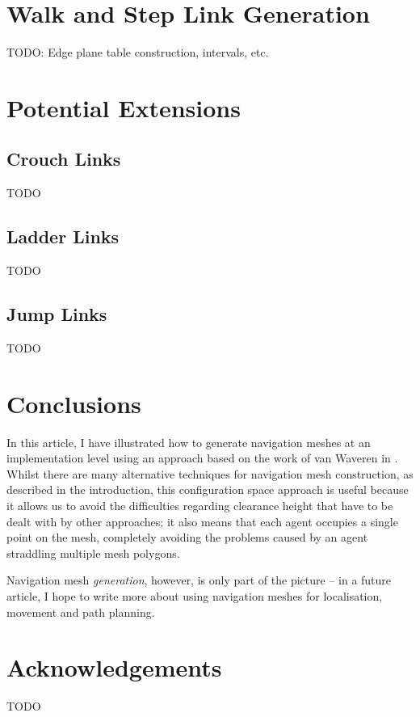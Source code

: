 \documentclass[10pt,twocolumn]{article}
\begin{document}
\section{Walk and Step Link Generation}
\label{sec:walkstep}

TODO: Edge plane table construction, intervals, etc.

\section{Potential Extensions}

\subsection{Crouch Links}

TODO

\subsection{Ladder Links}

TODO

\subsection{Jump Links}

TODO

\section{Conclusions}

In this article, I have illustrated how to generate navigation meshes at an implementation level using an approach based on the work of van Waveren in \cite{vanwaveren01}. Whilst there are many alternative techniques for navigation mesh construction, as described in the introduction, this configuration space approach is useful because it allows us to avoid the difficulties regarding clearance height that have to be dealt with by other approaches; it also means that each agent occupies a single point on the mesh, completely avoiding the problems caused by an agent straddling multiple mesh polygons.

Navigation mesh \emph{generation}, however, is only part of the picture -- in a future article, I hope to write more about using navigation meshes for localisation, movement and path planning.

\section{Acknowledgements}

TODO




\end{document}
